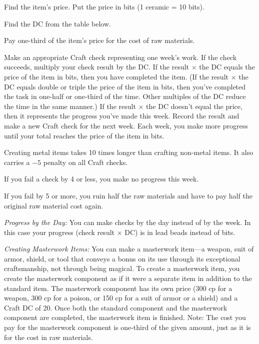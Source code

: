 \begin{enumerate*}
\item Find the item's price. Put the price in bits (1 ceramic = 10 bits).
\item Find the DC from the table below.
\item Pay one-third of the item's price for the cost of raw materials.
\item Make an appropriate Craft check representing one week's work. If the check succeeds, multiply your check result by the DC. If the result $\times$ the DC equals the price of the item in bits, then you have completed the item. (If the result $\times$ the DC equals double or triple the price of the item in bits, then you've completed the task in one-half or one-third of the time. Other multiples of the DC reduce the time in the same manner.) If the result $\times$ the DC doesn't equal the price, then it represents the progress you've made this week. Record the result and make a new Craft check for the next week. Each week, you make more progress until your total reaches the price of the item in bits.
\end{enumerate*}

Creating metal items takes 10 times longer than crafting non-metal items. It also carries a $-5$ penalty on all Craft checks.

If you fail a check by 4 or less, you make no progress this week.

If you fail by 5 or more, you ruin half the raw materials and have to pay half the original raw material cost again.

\textit{Progress by the Day:} You can make checks by the day instead of by the week. In this case your progress (check result $\times$ DC) is in lead beads instead of bits.

\textit{Creating Masterwork Items:} You can make a masterwork item---a weapon, suit of armor, shield, or tool that conveys a bonus on its use through its exceptional craftsmanship, not through being magical. To create a masterwork item, you create the masterwork component as if it were a separate item in addition to the standard item. The masterwork component has its own price (300 cp for a weapon, 300 cp for a poison, or 150 cp for a suit of armor or a shield) and a Craft DC of 20. Once both the standard component and the masterwork component are completed, the masterwork item is finished. Note: The cost you pay for the masterwork component is one-third of the given amount, just as it is for the cost in raw materials.

